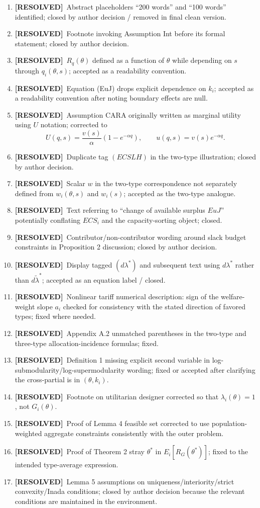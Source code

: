 \documentclass{class}
\newcommand{\ok}{\textcolor{ok}{\textbf{[RESOLVED]}}}
\begin{document}
\begin{enumerate}[leftmargin=1.5cm]
\item \ok\ Abstract placeholders ``200 words'' and ``100 words'' identified; closed by author decision / removed in final clean version.
\item \ok\ Footnote invoking Assumption Int before its formal statement; closed by author decision.
\item \ok\ $R_q(\theta)$ defined as a function of $\theta$ while depending on $s$ through $q_i(\theta,s)$; accepted as a readability convention.
\item \ok\ Equation (EuJ) drops explicit dependence on $k_i$; accepted as a readability convention after noting boundary effects are null.
\item \ok\ Assumption CARA originally written as marginal utility using $U$ notation; corrected to
\[
U(q,s)=\frac{v(s)}{\alpha}\left(1-e^{-\alpha q}\right),
\qquad
u(q,s)=v(s)e^{-\alpha q}.
\]
\item \ok\ Duplicate tag \((ECSLH)\) in the two-type illustration; closed by author decision.
\item \ok\ Scalar $w$ in the two-type correspondence not separately defined from $w_i(\theta,s)$ and $w_i(s)$; accepted as the two-type analogue.
\item \ok\ Text referring to ``change of available surplus \(EuJ\)'' potentially conflating \(ECS_i\) and the capacity-sorting object; closed.
\item \ok\ Contributor/non-contributor wording around slack budget constraints in Proposition 2 discussion; closed by author decision.
\item \ok\ Display tagged \((d\lambda^\ast)\) and subsequent text using $d\lambda^\ast$ rather than $d\tilde\lambda^\ast$; accepted as an equation label / closed.
\item \ok\ Nonlinear tariff numerical description: sign of the welfare-weight slope \(a_i\) checked for consistency with the stated direction of favored types; fixed where needed.
\item \ok\ Appendix A.2 unmatched parentheses in the two-type and three-type allocation-incidence formulas; fixed.
\item \ok\ Definition 1 missing explicit second variable in log-submodularity/log-supermodularity wording; fixed or accepted after clarifying the cross-partial is in \((\theta,k_i)\).
\item \ok\ Footnote on utilitarian designer corrected so that \(\lambda_i(\theta)=1\), not \(G_i(\theta)\).
\item \ok\ Proof of Lemma 4 feasible set corrected to use population-weighted aggregate constraints consistently with the outer problem.
\item \ok\ Proof of Theorem 2 stray \(\theta^\ast\) in \(E_i[R_G(\theta^\ast)]\); fixed to the intended type-average expression.
\item \ok\ Lemma 5 assumptions on uniqueness/interiority/strict convexity/Inada conditions; closed by author decision because the relevant conditions are maintained in the environment.
\end{enumerate}
\end{document}
